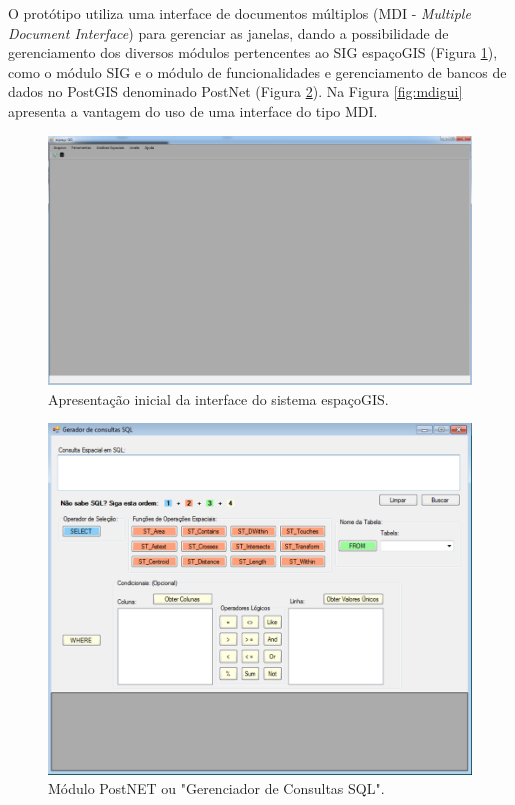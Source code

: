 O protótipo utiliza uma interface de documentos múltiplos (MDI - \textit{Multiple Document Interface}) para gerenciar as janelas, dando a possibilidade de gerenciamento dos diversos módulos pertencentes ao SIG espaçoGIS (Figura \ref{fig:espacogisgui}), como o módulo SIG e o módulo de funcionalidades e gerenciamento de bancos de dados no PostGIS denominado PostNet (Figura \ref{fig:postnetgui}). Na Figura \ref{fig:mdigui} apresenta a vantagem do uso de uma interface do tipo MDI.

	\begin{figure}
		\centering
		\includegraphics[width=0.8\linewidth]{data/espacoGIS_gui}
		\caption{Apresentação inicial da interface do sistema espaçoGIS.}
		\label{fig:espacogisgui}
	\end{figure}
	
	\begin{figure}
		\centering
		\includegraphics[width=1\linewidth]{data/postnet_gui}
		\caption{Módulo PostNET ou "Gerenciador de Consultas SQL".}
		\label{fig:postnetgui}
	\end{figure}

